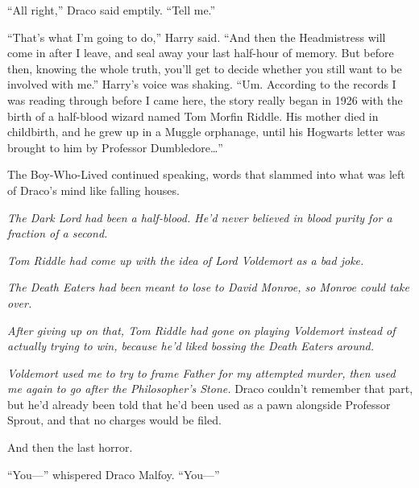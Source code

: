 “All right,” Draco said emptily. “Tell me.”

“That’s what I’m going to do,” Harry said. “And then the Headmistress will come in after I leave, and seal away your last half-hour of memory. But before then, knowing the whole truth, you’ll get to decide whether you still want to be involved with me.” Harry’s voice was shaking. “Um. According to the records I was reading through before I came here, the story really began in 1926 with the birth of a half-blood wizard named Tom Morfin Riddle. His mother died in childbirth, and he grew up in a Muggle orphanage, until his Hogwarts letter was brought to him by Professor Dumbledore…”

The Boy-Who-Lived continued speaking, words that slammed into what was left of Draco’s mind like falling houses.

\emph{The Dark Lord had been a half-blood. He’d never believed in blood purity for a fraction of a second.}

\emph{Tom Riddle had come up with the idea of Lord Voldemort as a bad joke.}

\emph{The Death Eaters had been meant to lose to David Monroe, so Monroe could take over.}

\emph{After giving up on that, Tom Riddle had gone on playing Voldemort instead of actually trying to win, because he’d liked bossing the Death Eaters around.}

\emph{Voldemort used me to try to frame Father for my attempted murder, then used me again to go after the Philosopher’s Stone.} Draco couldn’t remember that part, but he’d already been told that he’d been used as a pawn alongside Professor Sprout, and that no charges would be filed.

And then the last horror.

“You—” whispered Draco Malfoy. “You—”

